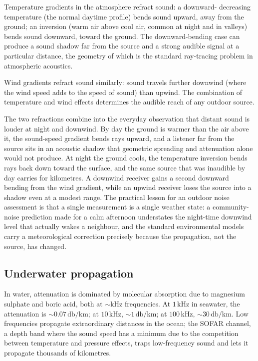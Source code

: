 

Temperature gradients in the atmosphere refract sound: a downward-
decreasing temperature (the normal daytime profile) bends sound
upward, away from the ground; an inversion (warm air above cool air,
common at night and in valleys) bends sound downward, toward the
ground. The downward-bending case can produce a sound shadow far
from the source and a strong audible signal at a particular distance,
the geometry of which is the standard ray-tracing problem in
atmospheric acoustics.

Wind gradients refract sound similarly: sound travels further
downwind (where the wind speed adds to the speed of sound) than
upwind. The combination of temperature and wind effects determines
the audible reach of any outdoor source.

The two refractions combine into the everyday observation that distant
sound is louder at night and downwind. By day the ground is warmer than the
air above it, the sound-speed gradient bends rays upward, and a listener far
from the source sits in an acoustic shadow that geometric spreading and
attenuation alone would not produce. At night the ground cools, the
temperature inversion bends rays back down toward the surface, and the same
source that was inaudible by day carries for kilometres. A downwind
receiver gains a second downward bending from the wind gradient, while an
upwind receiver loses the source into a shadow even at a modest range. The
practical lesson for an outdoor noise assessment is that a single
measurement is a single weather state: a community-noise prediction made
for a calm afternoon understates the night-time downwind level that
actually wakes a neighbour, and the standard environmental models carry a
meteorological correction precisely because the propagation, not the
source, has changed.

\subsection{Underwater propagation}

In water, attenuation is dominated by molecular absorption due to
magnesium sulphate and boric acid, both at $\sim\text{kHz}$
frequencies. At $1\,\si{\kilo\hertz}$ in seawater, the attenuation is
$\sim 0.07\,\si{\decibel\per\kilo\meter}$; at $10\,\si{\kilo\hertz}$,
$\sim 1\,\si{\decibel\per\kilo\meter}$; at $100\,\si{\kilo\hertz}$,
$\sim 30\,\si{\decibel\per\kilo\meter}$. Low frequencies propagate
extraordinary distances in the ocean; the SOFAR channel, a depth
band where the sound speed has a minimum due to the competition
between temperature and pressure effects, traps low-frequency sound
and lets it propagate thousands of kilometres.

